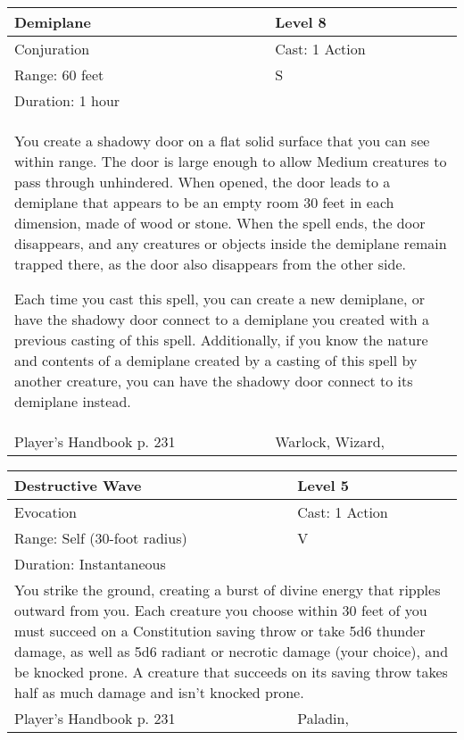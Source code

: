 \documentclass[11pt]{report}
\begin{document}
\begin{table}[H]
	\begin{tabular}{||p{6cm}|p{6cm}||}
		\hline\hline
		\bf{Demiplane} & Level 8\\ \hline
		Conjuration & Cast: 1 Action\\ \hline
		Range: 60 feet & S\\ \hline
		Duration: 1 hour & \\ \hline
		\multicolumn{2}{||p{12cm}||}{You create a shadowy door on a flat solid surface that you can see within range. 
The door is large enough to allow Medium creatures to pass through unhindered. When opened, the door leads to a demiplane that appears to be an empty room 30 feet in each dimension, made of wood or stone. When the spell ends, the door disappears, and any creatures or objects inside the demiplane remain trapped there, as the door also disappears from the other side. 

Each time you cast this spell, you can create a new demiplane, or have the shadowy door connect to a demiplane you created with a previous casting of this spell. Additionally, if you know the nature and contents of a demiplane created by a casting of  this spell by another creature, you can have the shadowy door connect to its demiplane instead.}\\ \hline
Player's Handbook p. 231 & Warlock, Wizard, \\ \hline\hline
	\end{tabular}
\end{table}

\begin{table}[H]
	\begin{tabular}{||p{6cm}|p{6cm}||}
		\hline\hline
		\bf{Destructive Wave} & Level 5\\ \hline
		Evocation & Cast: 1 Action\\ \hline
		Range: Self (30-foot radius) & V\\ \hline
		Duration: Instantaneous & \\ \hline
		\multicolumn{2}{||p{12cm}||}{You strike the ground, creating a burst of divine energy that ripples outward from you. Each creature you choose within 30 feet of you must succeed on a Constitution saving throw or take 5d6 thunder damage, as well as 5d6 radiant or necrotic damage (your choice), and be knocked prone. A creature that succeeds on its saving throw takes half as much damage and isn’t knocked prone.}\\ \hline
Player's Handbook p. 231 & Paladin, \\ \hline\hline
	\end{tabular}
\end{table}
\end{document}
